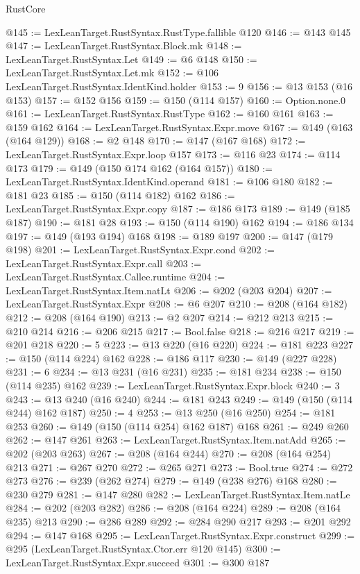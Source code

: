 \begin{lexlean}{RustCore}
\begin{coremodule}
@145 := LexLeanTarget.RustSyntax.RustType.fallible @120
@146 := @143 @145
@147 := LexLeanTarget.RustSyntax.Block.mk
@148 := LexLeanTarget.RustSyntax.Let
@149 := @6 @148
@150 := LexLeanTarget.RustSyntax.Let.mk
@152 := @106 LexLeanTarget.RustSyntax.IdentKind.holder
@153 := 9
@156 := @13 @153 (@16 @153)
@157 := @152 @156
@159 := @150 (@114 @157)
@160 := Option.none.{0}
@161 := LexLeanTarget.RustSyntax.RustType
@162 := @160 @161
@163 := @159 @162
@164 := LexLeanTarget.RustSyntax.Expr.move
@167 := @149 (@163 (@164 @129))
@168 := @2 @148
@170 := @147 (@167 @168)
@172 := LexLeanTarget.RustSyntax.Expr.loop @157
@173 := @116 @23
@174 := @114 @173
@179 := @149 (@150 @174 @162 (@164 @157))
@180 := LexLeanTarget.RustSyntax.IdentKind.operand
@181 := @106 @180
@182 := @181 @23
@185 := @150 (@114 @182) @162
@186 := LexLeanTarget.RustSyntax.Expr.copy
@187 := @186 @173
@189 := @149 (@185 @187)
@190 := @181 @28
@193 := @150 (@114 @190) @162
@194 := @186 @134
@197 := @149 (@193 @194) @168
@198 := @189 @197
@200 := @147 (@179 @198)
@201 := LexLeanTarget.RustSyntax.Expr.cond
@202 := LexLeanTarget.RustSyntax.Expr.call
@203 := LexLeanTarget.RustSyntax.Callee.runtime
@204 := LexLeanTarget.RustSyntax.Item.natLt
@206 := @202 (@203 @204)
@207 := LexLeanTarget.RustSyntax.Expr
@208 := @6 @207
@210 := @208 (@164 @182)
@212 := @208 (@164 @190)
@213 := @2 @207
@214 := @212 @213
@215 := @210 @214
@216 := @206 @215
@217 := Bool.false
@218 := @216 @217
@219 := @201 @218
@220 := 5
@223 := @13 @220 (@16 @220)
@224 := @181 @223
@227 := @150 (@114 @224) @162
@228 := @186 @117
@230 := @149 (@227 @228)
@231 := 6
@234 := @13 @231 (@16 @231)
@235 := @181 @234
@238 := @150 (@114 @235) @162
@239 := LexLeanTarget.RustSyntax.Expr.block
@240 := 3
@243 := @13 @240 (@16 @240)
@244 := @181 @243
@249 := @149 (@150 (@114 @244) @162 @187)
@250 := 4
@253 := @13 @250 (@16 @250)
@254 := @181 @253
@260 := @149 (@150 (@114 @254) @162 @187) @168
@261 := @249 @260
@262 := @147 @261
@263 := LexLeanTarget.RustSyntax.Item.natAdd
@265 := @202 (@203 @263)
@267 := @208 (@164 @244)
@270 := @208 (@164 @254) @213
@271 := @267 @270
@272 := @265 @271
@273 := Bool.true
@274 := @272 @273
@276 := @239 (@262 @274)
@279 := @149 (@238 @276) @168
@280 := @230 @279
@281 := @147 @280
@282 := LexLeanTarget.RustSyntax.Item.natLe
@284 := @202 (@203 @282)
@286 := @208 (@164 @224)
@289 := @208 (@164 @235) @213
@290 := @286 @289
@292 := @284 @290 @217
@293 := @201 @292
@294 := @147 @168
@295 := LexLeanTarget.RustSyntax.Expr.construct
@299 := @295 (LexLeanTarget.RustSyntax.Ctor.err @120 @145)
@300 := LexLeanTarget.RustSyntax.Expr.succeed
@301 := @300 @187

\end{coremodule}
\end{lexlean}

